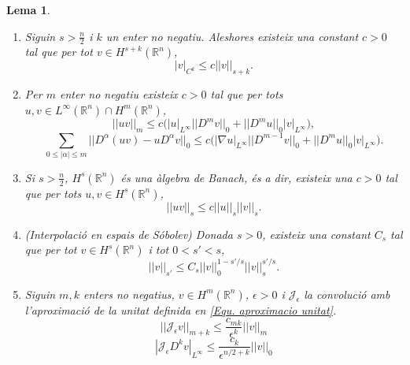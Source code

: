 \documentclass{article}
\numberwithin{equation}{section}
\newtheorem{lema}{Lema}[section]
\begin{document}
\begin{lema}\label{Lem: desigualtats Sobolev}
\begin{enumerate}
\item\label{Lem: desigualtats Sobolev 1} Siguin $s>\frac{n}{2}$ i $k$ un enter no negatiu. Aleshores existeix una constant $c>0$ tal que per tot $v\in H^{s+k}(\mathbb{R}^n)$,
\begin{equation}\label{Equ. desigualtats Sobolev 1}
|v|_{C^k}\leq c||v||_{s+k}.
\end{equation}
\item Per $m$ enter no negatiu existeix $c>0$ tal que per tots $u,v\in L^{\infty}(\mathbb{R}^n)\cap H^m(\mathbb{R}^n)$,
\begin{equation}\label{Equ. desigualtats Sobolev 21}
||uv||_m\leq c\big(|u|_{L^{\infty}}||D^mv||_0+||D^mu||_0|v|_{L^{\infty}}\big),
\end{equation}
\begin{equation}
\sum_{0\leq|\alpha|\leq m}||D^{\alpha}(uv)-uD^{\alpha}v||_0\leq c\big(|\nabla u|_{L^{\infty}}||D^{m-1}v||_0+||D^mu||_0|v|_{L^{\infty}}\big).
\end{equation}
\item Si $s>\frac{n}{2}$, $H^s(\mathbb{R}^n)$ \'{e}s una \`{a}lgebra de Banach, \'{e}s a dir, existeix una $c>0$ tal que per tots $u,v\in H^s(\mathbb{R}^n)$,
\begin{equation}
||uv||_s\leq c||u||_s||v||_s.
\end{equation}
\item (Interpolaci\'{o} en espais de S\'{o}bolev) Donada $s>0$, existeix una constant $C_s$ tal que per tot $v\in H^s(\mathbb{R}^n)$ i tot $0<s'<s$,
\begin{equation}\label{Equ. desigualtats Sobolev 4}
||v||_{s'}\leq C_s||v||_0^{1-s'/s}||v||_s^{s'/s}.
\end{equation}
\item Siguin $m,k$ enters no negatius, $v\in H^m(\mathbb{R}^n)$, $\epsilon>0$ i $\mathcal{J}_{\epsilon}$ la convoluci\'{o} amb l'aproximaci\'{o} de la unitat definida en \eqref{Equ. aproximacio unitat}.
\begin{equation}\label{Equ. desigualtats Sobolev 51}
||\mathcal{J}_{\epsilon}v||_{m+k}\leq\frac{c_{mk}}{\epsilon^k}||v||_m
\end{equation}
\begin{equation}\label{Equ. desigualtats Sobolev 52}
|\mathcal{J}_{\epsilon}D^kv|_{L^{\infty}}\leq\frac{c_k}{\epsilon^{n/2+k}}||v||_0
\end{equation}
\end{enumerate}
\end{lema}
\vspace{3mm}
\end{document}
